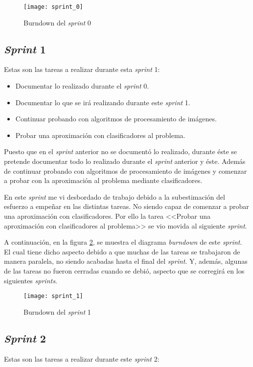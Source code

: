 \begin{figure}[h]
\centering
\texttt{[image: sprint\_0]}
\caption{Burndown del \textit{sprint} 0}
\label{fig:A.1.1}
\end{figure}

\subsection{\textit{Sprint} 1}
Estas son las tareas a realizar durante esta \textit{sprint} 1:

\begin{itemize}
	\item Documentar lo realizado durante el \textit{sprint} 0.
	\item Documentar lo que se irá realizando durante este \textit{sprint} 1.
	\item Continuar probando con algoritmos de procesamiento de imágenes.
	\item Probar una aproximación con clasificadores al problema.
\end{itemize}

Puesto que en el \textit{sprint} anterior no se documentó lo realizado, durante éste se pretende documentar todo lo realizado durante el \textit{sprint} anterior y éste. Además de continuar probando con algoritmos de procesamiento de imágenes y comenzar a probar con la aproximación al problema mediante clasificadores.

En este \textit{sprint} me vi desbordado de trabajo debido a la subestimación del esfuerzo a empeñar en las distintas tareas. No siendo capaz de comenzar a probar una aproximación con clasificadores. Por ello la tarea <<Probar una aproximación con clasificadores al problema>> se vio movida al siguiente \textit{sprint}. 

A continuación, en la figura \ref{fig:A.1.2}, se muestra el diagrama \textit{burndown} de este \textit{sprint}. El cual tiene dicho aspecto debido a que muchas de las tareas se trabajaron de manera paralela, no siendo acabadas hasta el final del \textit{sprint}. Y, además, algunas de las tareas no fueron cerradas cuando se debió, aspecto que se corregirá en los siguientes \textit{sprints}.

\begin{figure}
\centering
\texttt{[image: sprint\_1]}
\caption{Burndown del \textit{sprint} 1}
\label{fig:A.1.2}
\end{figure}

\subsection{\textit{Sprint} 2}
Estas son las tareas a realizar durante este \textit{sprint} 2:

